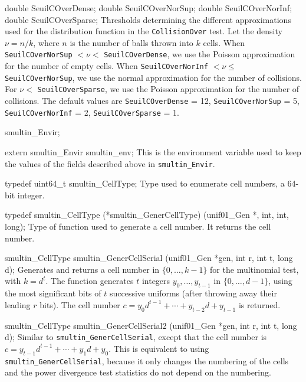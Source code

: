 {   double SeuilCOverDense;
   double SeuilCOverNorSup;
   double SeuilCOverNorInf;
   double SeuilCOverSparse;
\endcode
\tabb
  Thresholds determining the different approximations used for
  the distribution function in the {\tt CollisionOver} test.
  Let the density $\nu = n/k$, where $n$ is
  the number of balls thrown into $k$ cells.
  When {\tt SeuilCOverNorSup} $< \nu < $
  {\tt SeuilCOverDense},
  we use the Poisson approximation for the number of empty cells.
  When {\tt SeuilCOverNorInf} $< \nu \le $
  {\tt SeuilCOverNorSup}, we use  the
   normal approximation for the number of collisions.
   For $ \nu < $ {\tt SeuilCOverSparse},  we use  the
   Poisson  approximation  for the number of collisions.
   The  default values are {\tt SeuilCOverDense} = 12,
  {\tt SeuilCOverNorSup} = 5, {\tt SeuilCOverNorInf} = 2,
  {\tt SeuilCOverSparse} = 1.
\endtabb
\fi
\code

} smultin_Envir;


extern smultin_Envir smultin_env;
\endcode
\tab
   This is the environment variable used to keep the values of the fields
   described above in {\tt smultin\_Envir}.
\endtab




\code

typedef uint64_t smultin_CellType;
\endcode
  \tab Type used to enumerate cell numbers, a 64-bit integer.
  \endtab
\code


typedef smultin_CellType (*smultin_GenerCellType) (unif01_Gen *, int, int,
                                                   long);
\endcode
  \tab
   Type of function used to generate a cell number. It returns the cell
   number.
  \endtab
\code


smultin_CellType smultin_GenerCellSerial (unif01_Gen *gen, int r, int t,
                                          long d);
\endcode
 \tab  Generates and returns a cell number in $\{0,\dots,k-1\}$ for the
  multinomial test, with $k = d^t$. The function generates $t$ integers
  $y_0,\dots,y_{t-1}$ in $\{0,\dots,d-1\}$, using the most significant
  bits of $t$ successive uniforms
  (after throwing away their leading $r$ bits).
  The cell number $c = y_0 d^{t-1} + \cdots + y_{t-2} d + y_{t-1}$
  is returned.
 \endtab
\code


smultin_CellType smultin_GenerCellSerial2 (unif01_Gen *gen, int r, int t,
                                           long d);
\endcode
 \tab  Similar to {\tt smultin\_GenerCellSerial}, except that the
   cell number is   $c = y_{t-1} d^{t-1} + \cdots + y_{1} d + y_0$.
   This is equivalent to using {\tt smultin\_GenerCellSerial},
   because it only changes the numbering of the cells and the power
   divergence test statistics do not depend on the numbering.
 \endtab
\code



